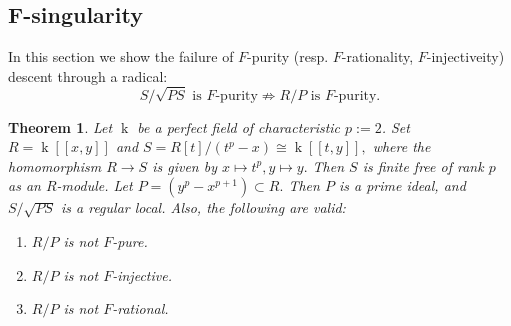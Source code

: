 \documentclass[10pt,a4paper]{amsart}
\newtheorem{theorem}{Theorem}[section]
\theoremstyle{definition}
\theoremstyle{remark}
\newcommand{\kk}{\operatorname{k}}
\begin{document}
\subsection{F-singularity}
In this section we show the failure of $F$-purity (resp. $F$-rationality, $F$-injectiveity) descent through a radical:
	\[
{S/\sqrt{PS}\text{ is  $F$-purity}\not\Longrightarrow R/P\text{ is $F$-purity.}}
\]
\begin{theorem}
	Let $\kk$ be a perfect field of characteristic $p:=2$. Set
 $
	R=\kk[[x,y]]
	$ and
 $
	S=R[t]/(t^p-x)\cong \kk[[t,y]],
	$ where the homomorphism $R\to S$ is given by
 $
	x\mapsto t^p, y\mapsto y.
	$ Then $S$ is finite free of rank $p$ as an $R$-module.
 Let
 $
	P=(y^p-x^{p+1})\subset R.
	$ Then $P$ is a prime ideal,   and $S/\sqrt{PS}$
	  is a regular local. Also, the following are valid:
	\begin{enumerate}
	\item[(1)] 
	$ 
	R/P
	$ 
	is not $F$-pure.
	\item[(2)] 
	$
	R/P
	$ is not $F$-injective.	\item[(3)] 
	$
	R/P
	$ 	is not $F$-rational.
\end{enumerate}	
\end{theorem}
\end{document}

